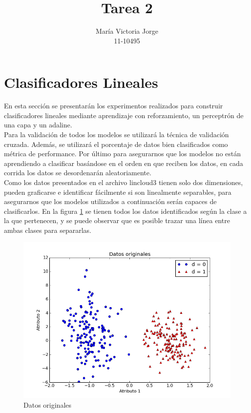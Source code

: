 \documentclass[a4paper]{article}
\title{Tarea 2}
\author{María Victoria Jorge \\ 11-10495}
\begin{document}
\maketitle

\section{Clasificadores Lineales}
	En esta sección se presentarán los experimentos realizados para construir clasificadores lineales mediante aprendizaje con reforzamiento, un perceptrón de una capa y un adaline.\\
	
	Para la validación de todos los modelos se utilizará la técnica de validación cruzada. Además, se utilizará el porcentaje de datos bien clasificados como métrica de performance. Por último para asegurarnos que los modelos no están aprendiendo a clasificar basándose en el orden en que reciben los datos, en cada corrida los datos se desordenarán aleatoriamente.\\
	
	Como los datos presentados en el archivo lincloud3 tienen solo dos dimensiones, pueden graficarse e identificar fácilmente si
	son linealmente separables, para asegurarnos que los modelos utilizados a continuación serán capaces de clasificarlos. En la figura \ref{fig:datosOriginales} se tienen todos los datos identificados según la clase a la que pertenecen, y se puede observar que es posible trazar una línea entre ambas clases para separarlas.
	
	\begin{figure}[H]
	  \centering
	  \includegraphics[scale=0.3]{datos.png}
	  \caption{Datos originales}
	  \label{fig:datosOriginales}
	\end{figure}
	
\end{document}
